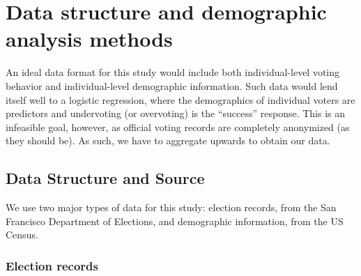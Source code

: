 \documentclass[12pt,twoside]{reedthesis}
\begin{document}
\hypertarget{demo-methods}{%
\chapter{Data structure and demographic analysis methods}\label{demo-methods}}

An ideal data format for this study would include both individual-level voting behavior and individual-level demographic information. Such data would lend itself well to a logistic regression, where the demographics of individual voters are predictors and undervoting (or overvoting) is the ``success'' response. This is an infeasible goal, however, as official voting records are completely anonymized (as they should be). As such, we have to aggregate upwards to obtain our data.

\hypertarget{data-structure-and-source}{%
\section{Data Structure and Source}\label{data-structure-and-source}}

We use two major types of data for this study: election records, from the San Francisco Department of Elections, and demographic information, from the US Census.

\hypertarget{election-records}{%
\subsection{Election records}\label{election-records}}
\end{document}

